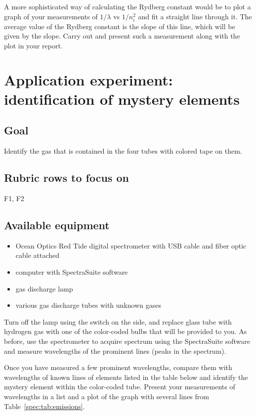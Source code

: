 A more sophisticated way of calculating the Rydberg constant would be to plot a graph of
your measurements of $1/\lambda$ vs $1/n_i^2$ and fit a straight line through it. The
average value of the Rydberg constant is the slope of this line, which will be given by the
slope. Carry out and present such a measurement along with the plot in your report.

\section{Application experiment: identification of mystery elements}

\subsection{Goal}

Identify the gas that is contained in the four tubes with colored tape on them.

\subsection{Rubric rows to focus on}

F1, F2

\subsection{Available equipment}

\begin{itemize}
	\item Ocean Optics Red Tide digital spectrometer with USB cable and fiber optic cable attached
	
	\item computer with SpectraSuite software
	
	\item gas discharge lamp
	
	\item various gas discharge tubes with unknown gases
\end{itemize}

Turn off the lamp using the switch on the side, and replace glass tube with hydrogen gas
with one of the color-coded bulbs that will be provided to you. As before, use the
spectrometer to acquire spectrum using the SpectraSuite software and measure
wavelengths of the prominent lines (peaks in the spectrum).

Once you have measured a few prominent wavelengths, compare them with wavelengths
of known lines of elements listed in the table below and identify the mystery element
within the color-coded tube. Present your measurements of wavelengths in a list and a
plot of the graph with several lines from Table~\ref{spec:tab:emissions}.

